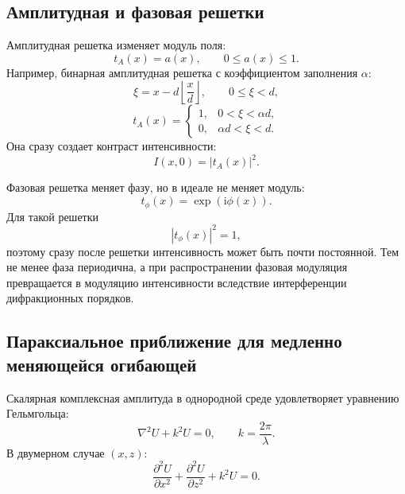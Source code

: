 \documentclass[12pt,a4paper]{article}
\newcommand{\ii}{\mathrm{i}}
\begin{document}
\subsection{Амплитудная и фазовая решетки}

Амплитудная решетка изменяет модуль поля:
\begin{equation}
    t_A(x)=a(x), \qquad 0\le a(x)\le 1.
\end{equation}
Например, бинарная амплитудная решетка с коэффициентом заполнения $\alpha$:
\begin{equation}
    \xi=x-d\left\lfloor\frac{x}{d}\right\rfloor,\qquad 0\le \xi<d,
\end{equation}
\begin{equation}
    t_A(x)=
    \begin{cases}
        1, & 0 < \xi < \alpha d,\\
        0, & \alpha d < \xi < d.
    \end{cases}
\end{equation}
Она сразу создает контраст интенсивности:
\begin{equation}
    I(x,0)=|t_A(x)|^2.
\end{equation}

Фазовая решетка меняет фазу, но в идеале не меняет модуль:
\begin{equation}
    t_\phi(x)=\exp(\ii\phi(x)).
\end{equation}
Для такой решетки
\begin{equation}
    |t_\phi(x)|^2=1,
\end{equation}
поэтому сразу после решетки интенсивность может быть почти постоянной. Тем не менее фаза периодична, а при распространении фазовая модуляция превращается в модуляцию интенсивности вследствие интерференции дифракционных порядков.

\subsection{Параксиальное приближение для медленно меняющейся огибающей}

Скалярная комплексная амплитуда в однородной среде удовлетворяет уравнению Гельмгольца:
\begin{equation}
    \nabla^2 U+k^2U=0,
    \qquad
    k=\frac{2\pi}{\lambda}.
    \label{eq:helmholtz}
\end{equation}
В двумерном случае $(x,z)$:
\begin{equation}
    \frac{\partial^2 U}{\partial x^2}
    +\frac{\partial^2 U}{\partial z^2}
    +k^2U=0.
\end{equation}
\end{document}
